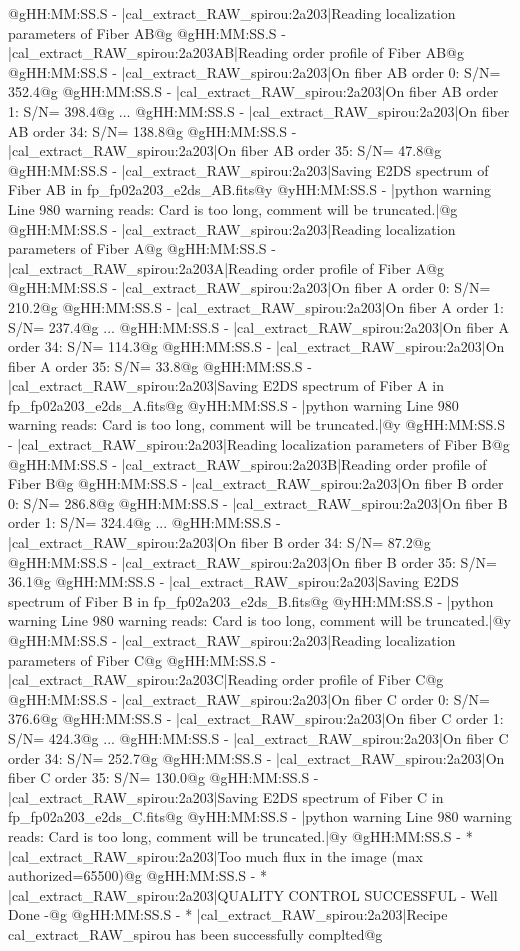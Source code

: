 \begin{cmdboxprintspecial}[fontupper=\tiny, fontlower=\tiny]
@gHH:MM:SS.S -   |cal_extract_RAW_spirou:2a203|Reading localization parameters of Fiber AB@g
@gHH:MM:SS.S -   |cal_extract_RAW_spirou:2a203AB|Reading order profile of Fiber AB@g
@gHH:MM:SS.S -   |cal_extract_RAW_spirou:2a203|On fiber AB order 0: S/N= 352.4@g
@gHH:MM:SS.S -   |cal_extract_RAW_spirou:2a203|On fiber AB order 1: S/N= 398.4@g
...
@gHH:MM:SS.S -   |cal_extract_RAW_spirou:2a203|On fiber AB order 34: S/N= 138.8@g
@gHH:MM:SS.S -   |cal_extract_RAW_spirou:2a203|On fiber AB order 35: S/N= 47.8@g
@gHH:MM:SS.S -   |cal_extract_RAW_spirou:2a203|Saving E2DS spectrum of Fiber AB in fp_fp02a203_e2ds_AB.fits@y
@yHH:MM:SS.S - \@ |python warning Line 980  warning reads: Card is too long, comment will be truncated.|@g
@gHH:MM:SS.S -   |cal_extract_RAW_spirou:2a203|Reading localization parameters of Fiber A@g
@gHH:MM:SS.S -   |cal_extract_RAW_spirou:2a203A|Reading order profile of Fiber A@g
@gHH:MM:SS.S -   |cal_extract_RAW_spirou:2a203|On fiber A order 0: S/N= 210.2@g
@gHH:MM:SS.S -   |cal_extract_RAW_spirou:2a203|On fiber A order 1: S/N= 237.4@g
...
@gHH:MM:SS.S -   |cal_extract_RAW_spirou:2a203|On fiber A order 34: S/N= 114.3@g
@gHH:MM:SS.S -   |cal_extract_RAW_spirou:2a203|On fiber A order 35: S/N= 33.8@g
@gHH:MM:SS.S -   |cal_extract_RAW_spirou:2a203|Saving E2DS spectrum of Fiber A in fp_fp02a203_e2ds_A.fits@g
@yHH:MM:SS.S - \@ |python warning Line 980  warning reads: Card is too long, comment will be truncated.|@y
@gHH:MM:SS.S -   |cal_extract_RAW_spirou:2a203|Reading localization parameters of Fiber B@g
@gHH:MM:SS.S -   |cal_extract_RAW_spirou:2a203B|Reading order profile of Fiber B@g
@gHH:MM:SS.S -   |cal_extract_RAW_spirou:2a203|On fiber B order 0: S/N= 286.8@g
@gHH:MM:SS.S -   |cal_extract_RAW_spirou:2a203|On fiber B order 1: S/N= 324.4@g
...
@gHH:MM:SS.S -   |cal_extract_RAW_spirou:2a203|On fiber B order 34: S/N= 87.2@g
@gHH:MM:SS.S -   |cal_extract_RAW_spirou:2a203|On fiber B order 35: S/N= 36.1@g
@gHH:MM:SS.S -   |cal_extract_RAW_spirou:2a203|Saving E2DS spectrum of Fiber B in fp_fp02a203_e2ds_B.fits@g
@yHH:MM:SS.S - \@ |python warning Line 980  warning reads: Card is too long, comment will be truncated.|@y
@gHH:MM:SS.S -   |cal_extract_RAW_spirou:2a203|Reading localization parameters of Fiber C@g
@gHH:MM:SS.S -   |cal_extract_RAW_spirou:2a203C|Reading order profile of Fiber C@g
@gHH:MM:SS.S -   |cal_extract_RAW_spirou:2a203|On fiber C order 0: S/N= 376.6@g
@gHH:MM:SS.S -   |cal_extract_RAW_spirou:2a203|On fiber C order 1: S/N= 424.3@g
...
@gHH:MM:SS.S -   |cal_extract_RAW_spirou:2a203|On fiber C order 34: S/N= 252.7@g
@gHH:MM:SS.S -   |cal_extract_RAW_spirou:2a203|On fiber C order 35: S/N= 130.0@g
@gHH:MM:SS.S -   |cal_extract_RAW_spirou:2a203|Saving E2DS spectrum of Fiber C in fp_fp02a203_e2ds_C.fits@g
@yHH:MM:SS.S - \@ |python warning Line 980  warning reads: Card is too long, comment will be truncated.|@y
@gHH:MM:SS.S - * |cal_extract_RAW_spirou:2a203|Too much flux in the image (max authorized=65500)@g
@gHH:MM:SS.S - * |cal_extract_RAW_spirou:2a203|QUALITY CONTROL SUCCESSFUL - Well Done -@g
@gHH:MM:SS.S - * |cal_extract_RAW_spirou:2a203|Recipe cal_extract_RAW_spirou has been successfully complted@g
\end{cmdboxprintspecial}


